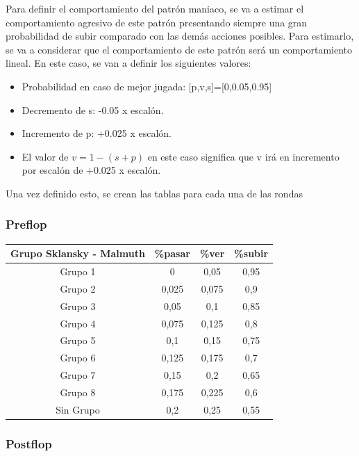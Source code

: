 Para definir el comportamiento del patrón maniaco, se va a estimar el comportamiento agresivo de este patrón presentando siempre una gran probabilidad de subir comparado con las demás acciones posibles. 
Para estimarlo, se va a considerar que el comportamiento de este patrón será un comportamiento lineal.
En este caso, se van a definir los siguientes valores:
\begin{itemize}
\item Probabilidad en caso de mejor jugada: [p,v,s]=[0,0.05,0.95]
\item Decremento de s: -0.05 x escalón.
\item Incremento de p: +0.025 x escalón.
\item El valor de $v=1-(s+p)$ en este caso significa que v irá en incremento por escalón de +0.025 x escalón.
\end{itemize}
Una vez definido esto, se crean las tablas para cada una de las rondas

\subsubsection{Preflop}

\begin{longtable}[c]{|c|c|c|c|}
\hline
\rowcolor{lightgray}Grupo Sklansky - Malmuth & \%pasar & \%ver & \%subir \\
\hline
Grupo 1 & 0 & 0,05 & 0,95 \\
\hline
Grupo 2 & 0,025 & 0,075 & 0,9 \\
\hline
Grupo 3 & 0,05 & 0,1 & 0,85 \\
\hline
Grupo 4 & 0,075 & 0,125 & 0,8 \\
\hline
Grupo 5 & 0,1 & 0,15 & 0,75 \\
\hline
Grupo 6 & 0,125 & 0,175 & 0,7 \\
\hline
Grupo 7 & 0,15 & 0,2 & 0,65 \\
\hline
Grupo 8 & 0,175 & 0,225 & 0,6 \\
\hline
Sin Grupo & 0,2 & 0,25 & 0,55\\
\hline

\end{longtable}

\subsubsection{Postflop}

